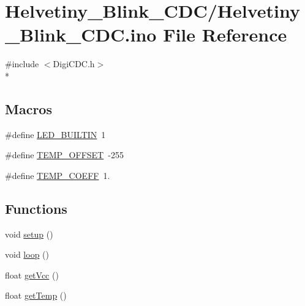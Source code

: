 \hypertarget{Helvetiny__Blink__CDC_8ino}{\section{Helvetiny\-\_\-\-Blink\-\_\-\-C\-D\-C/\-Helvetiny\-\_\-\-Blink\-\_\-\-C\-D\-C.ino File Reference}
\label{Helvetiny__Blink__CDC_8ino}
}
{\ttfamily \#include $<$Digi\-C\-D\-C.\-h$>$}\\*
\subsection*{Macros}
\begin{DoxyCompactItemize}
\item 
\#define \hyperlink{Helvetiny__Blink__CDC_8ino_a450a7c16ead7b3c7b882536b08f30a00}{L\-E\-D\-\_\-\-B\-U\-I\-L\-T\-I\-N}~1
\item 
\#define \hyperlink{Helvetiny__Blink__CDC_8ino_a3cb24f09004f92185b77e9e7bac6ea61}{T\-E\-M\-P\-\_\-\-O\-F\-F\-S\-E\-T}~-\/255
\item 
\#define \hyperlink{Helvetiny__Blink__CDC_8ino_ab667d793bed5c1fb5503624b0ab7504a}{T\-E\-M\-P\-\_\-\-C\-O\-E\-F\-F}~1.
\end{DoxyCompactItemize}
\subsection*{Functions}
\begin{DoxyCompactItemize}
\item 
void \hyperlink{Helvetiny__Blink__CDC_8ino_a4fc01d736fe50cf5b977f755b675f11d}{setup} ()
\item 
void \hyperlink{Helvetiny__Blink__CDC_8ino_afe461d27b9c48d5921c00d521181f12f}{loop} ()
\item 
float \hyperlink{Helvetiny__Blink__CDC_8ino_a2c828cd063b3ce07f93328c3b02aa70b}{get\-Vcc} ()
\item 
float \hyperlink{Helvetiny__Blink__CDC_8ino_a6459ed0635e25efb428ae3dfe1cab682}{get\-Temp} ()
\end{DoxyCompactItemize}


